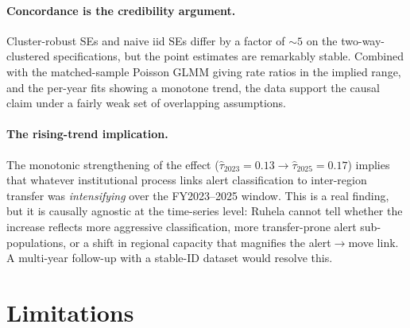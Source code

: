 \documentclass[11pt,a4paper]{article}
\newcommand{\1}{\mathbf{1}}
\theoremstyle{plain}
\theoremstyle{definition}
\begin{document}
\paragraph{Concordance is the credibility argument.}  Cluster-robust
SEs and naive iid SEs differ by a factor of $\sim 5$ on the
two-way-clustered specifications, but the point estimates are
remarkably stable.  Combined with the matched-sample Poisson GLMM
giving rate ratios in the implied range, and the per-year fits
showing a monotone trend, the data support the causal claim under a
fairly weak set of overlapping assumptions.

\paragraph{The rising-trend implication.}  The monotonic
strengthening of the effect ($\hat\tau_{2023} = 0.13 \to
\hat\tau_{2025} = 0.17$) implies that whatever institutional process
links alert classification to inter-region transfer was
\emph{intensifying} over the FY2023--2025 window.  This is a real
finding, but it is causally agnostic at the time-series level: Ruhela
cannot tell whether the increase reflects more aggressive
classification, more transfer-prone alert sub-populations, or a
shift in regional capacity that magnifies the alert$\to$move link.
A multi-year follow-up with a stable-ID dataset would resolve this.

\section{Limitations}\label{sec:limits}
\end{document}
